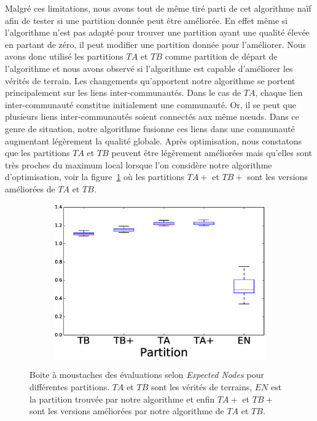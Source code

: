 Malgré ces limitations, nous avons tout de même tiré parti de cet algorithme naïf afin de tester si une partition donnée peut être améliorée.
En effet même si l'algorithme n'est pas adapté pour trouver une partition ayant une qualité élevée en partant de zéro, il peut modifier une partition donnée pour l'améliorer. 
Nous avons donc utilisé les partitions $TA$ et $TB$ comme partition de départ de l'algorithme et nous avons observé si l'algorithme est capable d'améliorer les vérités de terrain.
Les changements qu'apportent notre algorithme se portent principalement sur les liens inter-communautés.
Dans le cas de $TA$, chaque lien inter-communauté constitue initialement une communauté.
Or, il se peut que plusieurs liens inter-communautés soient connectés aux même n\oe uds.
Dans ce genre de situation, notre algorithme fusionne ces liens dans une communauté augmentant légèrement la qualité globale.
Après optimisation, nous constatons que les partitions $TA$ et $TB$ peuvent être légèrement améliorées mais qu'elles sont très proches du maximum local lorsque l'on considère notre algorithme d'optimisation,
voir la figure~\ref{fig:LF_bis_EN} où les partitions $TA+$ et $TB+$ sont les versions améliorées de $TA$ et $TB$.
\begin{figure}
\centering
	\begin{subfigure}{0.31\textwidth}
		\includegraphics[width=\linewidth]{img/ExpectedNodes/LF/LFR1_Modified_ALL.eps}
	\end{subfigure}
	
	\caption{Boite à moustaches des évaluations selon \emph{Expected Nodes} pour différentes partitions.
	$TA$ et $TB$ sont les vérités de terrains, $EN$ est la partition trouvée par notre algorithme et enfin $TA+$ et $TB+$ sont les versions améliorées par notre algorithme de $TA$ et $TB$.
	}
	\label{fig:LF_bis_EN}
\end{figure}

